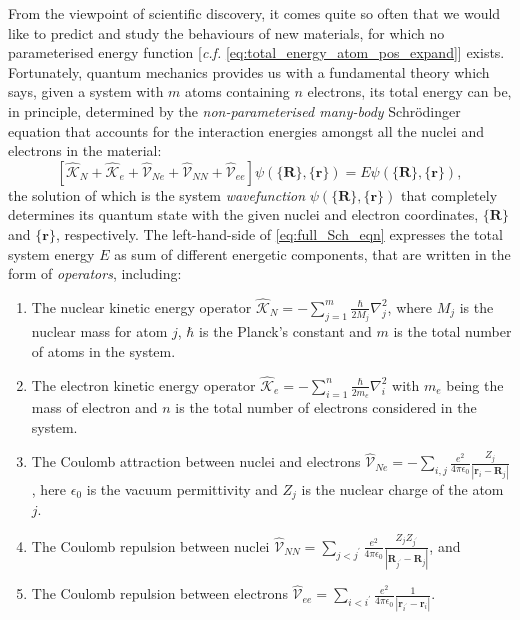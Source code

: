 
From the viewpoint of scientific discovery, it comes quite so often that we would like to predict and study the behaviours of new materials, for which no parameterised energy function [\emph{c.f.} \cref{eq:total_energy_atom_pos_expand}] exists. Fortunately, quantum mechanics provides us with a fundamental theory which says, given a system with $m$ atoms containing $n$ electrons, its total energy can be, in principle, determined by the \emph{non-parameterised many-body} Schr\"{o}dinger equation that accounts for the interaction energies amongst all the nuclei and electrons in the material:
\begin{equation}\label{eq:full_Sch_eqn}
\left[\hat{\mathcal{K}}_N+\hat{\mathcal{K}}_e+\hat{\mathcal{V}}_{Ne}+\hat{\mathcal{V}}_{NN}+\hat{\mathcal{V}}_{ee}\right]\psi\left(\{\bm{R}\},\{\bm{r}\}\right)=E\psi\left(\{\bm{R}\},\{\bm{r}\}\right),
\end{equation}
the solution of which is the system \emph{wavefunction} $\psi\left(\{\bm{R}\},\{\bm{r}\}\right)$ that completely determines its quantum state with the given nuclei and electron coordinates, $\{\bm{R}\}$ and $\{\bm{r}\}$, respectively. The left-hand-side of \cref{eq:full_Sch_eqn} expresses the total system energy $E$ as sum of different energetic components, that are written in the form of \emph{operators}, including:
\begin{enumerate}
    \item The nuclear kinetic energy operator $\hat{\mathcal{K}}_N=\displaystyle{-\sum_{j=1}^{m}\frac{\hbar}{2M_j}\nabla_j^2}$, where $M_j$ is the nuclear mass for atom $j$, $\hbar$ is the Planck's constant and $m$ is the total number of atoms in the system.
    \item The electron kinetic energy operator $\hat{\mathcal{K}}_e=\displaystyle{-\sum_{i=1}^{n}\frac{\hbar}{2m_e}\nabla_i^2}$ with $m_e$ being the mass of electron and $n$ is the total number of electrons considered in the system.
    \item The  Coulomb attraction between nuclei and electrons $\hat{\mathcal{V}}_{Ne}=-\displaystyle{\sum_{i,j}\frac{e^2}{4\pi\epsilon_{0}}\frac{Z_j}{\left\vert \bm{r}_i-\bm{R}_{j}\right\vert}}$, here $\epsilon_{0}$ is the vacuum permittivity and $Z_j$ is the nuclear charge of the atom $j$.
    \item The Coulomb repulsion between nuclei  $\hat{\mathcal{V}}_{NN}=\displaystyle{\sum_{j<j^\prime}\frac{e^2}{4\pi\epsilon_{0}}\frac{Z_j Z_{j^\prime}}{\left\vert \bm{R}_{j^\prime}-\bm{R}_{j}\right\vert}}$, and
    \item The Coulomb repulsion between electrons $\hat{\mathcal{V}}_{ee}=\displaystyle{\sum_{i<i^\prime}\frac{e^2}{4\pi\epsilon_{0}}\frac{1}{\left\vert \bm{r}_{i^\prime}-\bm{r}_{i}\right\vert}}$.
\end{enumerate}



